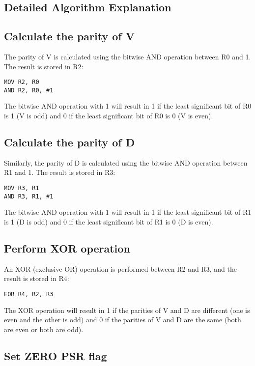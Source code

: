 \begin{thebibliography}{9}
\section{Detailed Algorithm Explanation}

\subsection{Calculate the parity of V}

The parity of V is calculated using the bitwise AND operation between R0 and 1. The result is stored in R2:

\begin{verbatim}
MOV R2, R0
AND R2, R0, #1
\end{verbatim}

The bitwise AND operation with 1 will result in 1 if the least significant bit of R0 is 1 (V is odd) and 0 if the least significant bit of R0 is 0 (V is even).

\subsection{Calculate the parity of D}

Similarly, the parity of D is calculated using the bitwise AND operation between R1 and 1. The result is stored in R3:

\begin{verbatim}
MOV R3, R1
AND R3, R1, #1
\end{verbatim}

The bitwise AND operation with 1 will result in 1 if the least significant bit of R1 is 1 (D is odd) and 0 if the least significant bit of R1 is 0 (D is even).

\subsection{Perform XOR operation}

An XOR (exclusive OR) operation is performed between R2 and R3, and the result is stored in R4:

\begin{verbatim}
EOR R4, R2, R3
\end{verbatim}

The XOR operation will result in 1 if the parities of V and D are different (one is even and the other is odd) and 0 if the parities of V and D are the same (both are even or both are odd).

\subsection{Set ZERO PSR flag}


\end{thebibliography}
